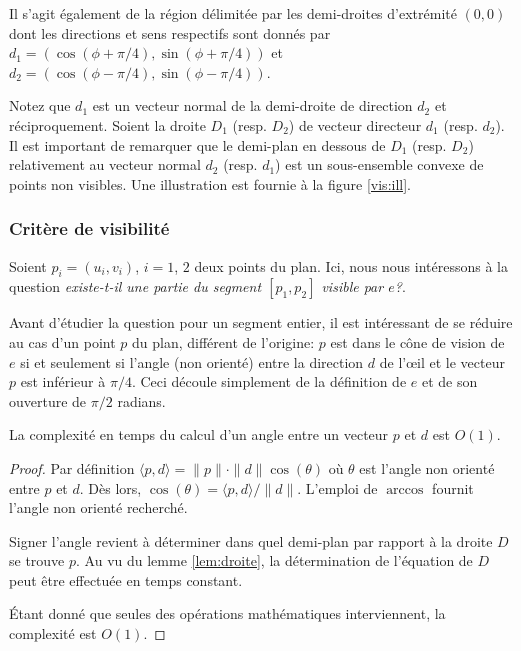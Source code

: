 Il s'agit également de la région délimitée par les demi-droites d'extrémité
$(0, 0)$ dont les directions et sens respectifs sont donnés par
$d_1 = (\cos(\phi + \pi/4), \sin(\phi + \pi/4))$ et
$d_2 = (\cos(\phi - \pi/4), \sin(\phi - \pi/4))$.

Notez que $d_1$ est un vecteur
normal de la demi-droite de direction $d_2$ et réciproquement.
Soient la droite $D_1$ (resp. $D_2$) de vecteur directeur $d_1$
(resp. $d_2$). Il est important de remarquer
que le demi-plan en dessous de $D_1$ (resp. $D_2$) relativement au vecteur
normal $d_2$ (resp. $d_1$) est un sous-ensemble convexe de points non visibles.
Une illustration est fournie à la figure \ref{vis:ill}.


\subsubsection{Critère de visibilité}
Soient $p_i=(u_i, v_i)$, $i = 1$, $2$ deux points du plan. Ici, nous nous
intéressons à la question \og\emph{existe-t-il une partie du segment $[p_1, p_2]$
  visible par $e$?}\fg.

Avant d'étudier la question pour un segment entier, il est intéressant de
se réduire au cas d'un point $p$ du plan, différent de l'origine:
$p$ est dans le cône de vision de $e$
si et seulement si l'angle (non orienté) entre la direction
$d$ de l'\oe{}il et le vecteur $p$
est inférieur
à $\pi/4$. Ceci découle simplement de la définition de $e$ et de son ouverture
de $\pi/2$ radians.

\begin{lem}\label{lem:angle}
  La complexité en temps du calcul d'un angle entre un vecteur $p$ et $d$ est
  $O(1)$.
\end{lem}
\begin{proof}
  Par définition $\langle p, d\rangle = \|p\|\cdot \|d\| \cos(\theta)$ où $\theta$ est
  l'angle non orienté entre $p$ et $d$.
  Dès lors, $\cos(\theta) = \langle p, d\rangle/\|d\|$. L'emploi de $\arccos$
  fournit l'angle non orienté recherché.

  Signer l'angle revient à déterminer
  dans quel demi-plan par rapport à la droite $D$ se trouve $p$.
  Au vu du lemme \ref{lem:droite}, la détermination de l'équation de $D$
  peut être effectuée en temps constant.

  \'Etant donné que seules des opérations mathématiques interviennent,
  la complexité est $O(1)$.
\end{proof}

